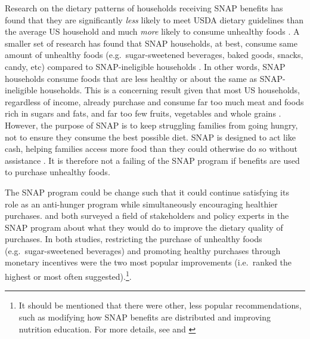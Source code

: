 \documentclass[12pt,letterpaperpaper,]{book}
\begin{document}
Research on the dietary patterns of households receiving SNAP benefits
has found that they are significantly \emph{less} likely to meet USDA
dietary guidelines than the average US household and much \emph{more}
likely to consume unhealthy foods
\citep{andreyeva_dietary_2015, nguyen_supplemental_2015, wolfson_fruit_2015}.
A smaller set of research has found that SNAP households, at best,
consume same amount of unhealthy foods (e.g.~sugar-sweetened beverages,
baked goods, snacks, candy, etc) compared to SNAP-ineligible households
\citep{todd_caloric_2014, hoynes_snap_2015}. In other words, SNAP
households consume foods that are less healthy or about the same as
SNAP-ineligible households. This is a concerning result given that most
US households, regardless of income, already purchase and consume far
too much meat and foods rich in sugars and fats, and far too few fruits,
vegetables and whole grains
\citep{usda_scientific_2015, frazao_high_1999}. However, the purpose of
SNAP is to keep struggling families from going hungry, not to ensure
they consume the best possible diet. SNAP is designed to act like cash,
helping families access more food than they could otherwise do so
without assistance \citep{hoynes_snap_2015}. It is therefore not a
failing of the SNAP program if benefits are used to purchase unhealthy
foods.

The SNAP program could be change such that it could continue satisfying
its role as an anti-hunger program while simultaneously encouraging
healthier purchases. \citet{blumenthal_strategies_2014} and
\citet{leung_qualitative_2013} both surveyed a field of stakeholders and
policy experts in the SNAP program about what they would do to improve
the dietary quality of purchases. In both studies, restricting the
purchase of unhealthy foods (e.g.~sugar-sweetened beverages) and
promoting healthy purchases through monetary incentives were the two
most popular improvements (i.e.~ranked the highest or most often
suggested).\footnote{It should be mentioned that there were other, less
  popular recommendations, such as modifying how SNAP benefits are
  distributed and improving nutrition education. For more details, see
  \citet{blumenthal_strategies_2014} and \citet{leung_qualitative_2013}}.
\end{document}
